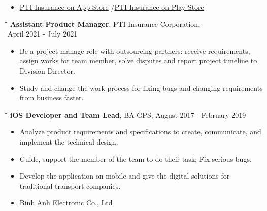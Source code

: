 \documentclass[margin, 10pt]{res}
\begin{document}
\begin{resume}
\begin{itemize}
   \item {\color{blue}\href{https://apps.apple.com/us/developer/pti-insurance/id1253321255}{PTI Insurance on App Store}} /{\color{blue}\href{https://play.google.com/store/apps/developer?id=PTI+Insurance}{PTI Insurance on Play Store}}
   \end{itemize}

	\begin{tabbing}
		\hspace{2.0in}\= \hspace{2.0in}\= \kill %
		{\bf Assistant Product Manager}, PTI Insurance Corporation, \\April 2021 - July 2021\\
	\end{tabbing}\vspace{-20pt} %
	
	\begin{itemize}
		\item Be a project manage role with outsourcing partners: receive requirements, assign works for team member, solve disputes and report project timeline to Division Director.
		\item Study and change the work process for fixing bugs and changing requirements from business faster.
	\end{itemize}

   \begin{tabbing}
   \hspace{2.0in}\= \hspace{2.0in}\= \kill %
   {\bf iOS Developer and Team Lead}, BA GPS, August 2017 - February 2019\\
   \end{tabbing}\vspace{-20pt} %

   \begin{itemize}
		\item Analyze product requirements and specifications to create, communicate, and implement the technical design.
		\item Guide, support the member of the team to do their task; Fix serious bugs.
      \item Develop the application on mobile and give the digital solutions for traditional transport companies.
      \item {\color{blue}\href{https://itunes.apple.com/vn/developer/binh-anh-electronic-co-ltd/id1020602455?l=vi&mt=8}{Binh Anh Electronic Co., Ltd}}
   \end{itemize}


\end{resume}
\end{document}
